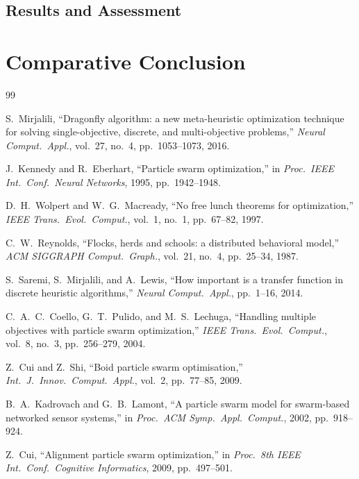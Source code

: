 \documentclass[11pt,a4paper]{article}
\begin{document}
\subsection*{Results and Assessment}


\section{Comparative Conclusion}
\label{sec:conclusion}




\begin{thebibliography}{99}


S.~Mirjalili, ``Dragonfly algorithm: a new meta-heuristic optimization technique
for solving single-objective, discrete, and multi-objective problems,''
\textit{Neural Comput.\ Appl.}, vol.~27, no.~4, pp.~1053--1073, 2016.

J.~Kennedy and R.~Eberhart, ``Particle swarm optimization,'' in
\textit{Proc.\ IEEE Int.\ Conf.\ Neural Networks}, 1995, pp.~1942--1948.

D.~H.~Wolpert and W.~G.~Macready, ``No free lunch theorems for optimization,''
\textit{IEEE Trans.\ Evol.\ Comput.}, vol.~1, no.~1, pp.~67--82, 1997.

C.~W.~Reynolds, ``Flocks, herds and schools: a distributed behavioral model,''
\textit{ACM SIGGRAPH Comput.\ Graph.}, vol.~21, no.~4, pp.~25--34, 1987.

S.~Saremi, S.~Mirjalili, and A.~Lewis, ``How important is a transfer function
in discrete heuristic algorithms,''
\textit{Neural Comput.\ Appl.}, pp.~1--16, 2014.

C.~A.~C.~Coello, G.~T.~Pulido, and M.~S.~Lechuga, ``Handling multiple
objectives with particle swarm optimization,''
\textit{IEEE Trans.\ Evol.\ Comput.}, vol.~8, no.~3, pp.~256--279, 2004.

Z.~Cui and Z.~Shi, ``Boid particle swarm optimisation,''
\textit{Int.\ J.\ Innov.\ Comput.\ Appl.}, vol.~2, pp.~77--85, 2009.

B.~A.~Kadrovach and G.~B.~Lamont, ``A particle swarm model for swarm-based
networked sensor systems,'' in
\textit{Proc.\ ACM Symp.\ Appl.\ Comput.}, 2002, pp.~918--924.

Z.~Cui, ``Alignment particle swarm optimization,'' in
\textit{Proc.\ 8th IEEE Int.\ Conf.\ Cognitive Informatics}, 2009,
pp.~497--501.


\end{thebibliography}
\end{document}
